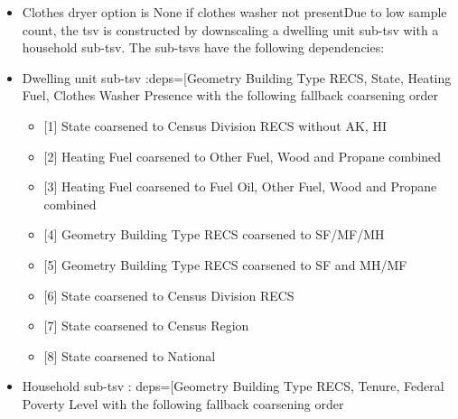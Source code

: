 \begin{itemize}
 
\item
  Clothes dryer option is None if clothes washer not presentDue to low
  sample count, the tsv is constructed by downscaling a dwelling unit
  sub-tsv with a household sub-tsv. The sub-tsvs have the following
  dependencies:
\item
  Dwelling unit sub-tsv :deps={[}\textquotesingle Geometry Building Type
  RECS\textquotesingle, \textquotesingle State\textquotesingle,
  \textquotesingle Heating Fuel\textquotesingle,
  \textquotesingle Clothes Washer Presence\textquotesingle{]} with the
  following fallback coarsening order

  \begin{itemize}
   
  \item
    {[}1{]} State coarsened to Census Division RECS without AK, HI
  \item
    {[}2{]} Heating Fuel coarsened to Other Fuel, Wood and Propane
    combined
  \item
    {[}3{]} Heating Fuel coarsened to Fuel Oil, Other Fuel, Wood and
    Propane combined
  \item
    {[}4{]} Geometry Building Type RECS coarsened to SF/MF/MH
  \item
    {[}5{]} Geometry Building Type RECS coarsened to SF and MH/MF
  \item
    {[}6{]} State coarsened to Census Division RECS
  \item
    {[}7{]} State coarsened to Census Region
  \item
    {[}8{]} State coarsened to National
  \end{itemize}
\item
  Household sub-tsv : deps={[}\textquotesingle Geometry Building Type
  RECS\textquotesingle, \textquotesingle Tenure\textquotesingle,
  \textquotesingle Federal Poverty Level\textquotesingle{]} with the
  following fallback coarsening order

  \begin{itemize}
   

\end{itemize}
\end{itemize}
